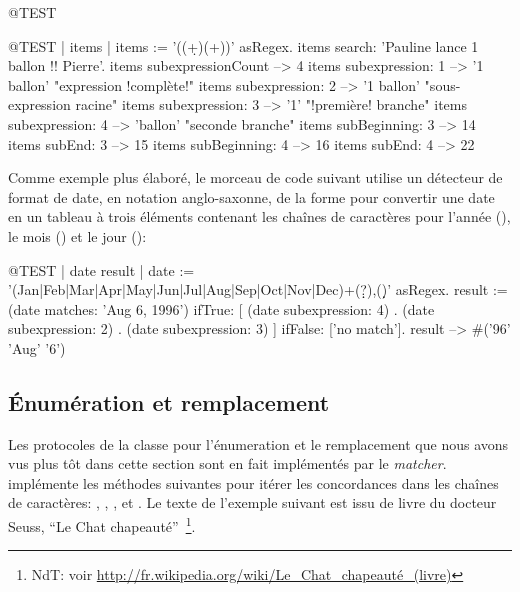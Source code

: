 \documentclass[a4paper,10pt,twoside]{book}
\begin{document}
\begin{code}{@TEST}
\begin{code}{@TEST | items |}
items := '((\d+)\s*(\w+))' asRegex.
items search: 'Pauline lance 1 ballon !! Pierre'.
items subexpressionCount --> 4
items subexpression: 1      --> '1 ballon'    "expression !complète!"
items subexpression: 2      --> '1 ballon'    "sous-expression racine"
items subexpression: 3      --> '1'             "!première! branche"
items subexpression: 4      --> 'ballon'       "seconde branche"
items subBeginning: 3       --> 14
items subEnd: 3                 --> 15
items subBeginning: 4       --> 16
items subEnd: 4                 --> 22
\end{code}

Comme exemple plus élaboré, le morceau de code suivant utilise un
détecteur de format de date,
en notation anglo-saxonne,
de la forme \mbox{}  pour convertir une date en un tableau à
trois éléments contenant les chaînes de caractères pour l'année
(), le mois () et le jour ():

\begin{code}{@TEST | date result |}
date := '(Jan|Feb|Mar|Apr|May|Jun|Jul|Aug|Sep|Oct|Nov|Dec)\s+(\d\d?)\s*,(\d\d)' asRegex.
result := (date matches: 'Aug 6, 1996')
       ifTrue: [{ (date subexpression: 4) .
				(date subexpression: 2) .
				(date subexpression: 3) } ]
        ifFalse: ['no match'].
result --> #('96' 'Aug' '6')
\end{code}

\subsection{Énumération et remplacement}

Les protocoles de la classe  pour l'énumeration
 et le remplacement que nous avons vus plus tôt
dans cette section sont en fait implémentés par le \emph{matcher}. 
 implémente les méthodes suivantes pour itérer les
concordances dans les chaînes de caractères:
,
\mbox{,}
,
 et
\mbox{.}
Le texte de l'exemple suivant est issu de livre du docteur Seuss, ``Le Chat chapeauté''~\footnote{NdT: voir \url{http://fr.wikipedia.org/wiki/Le_Chat_chapeauté_(livre)}}.


\end{code}
\end{document}

